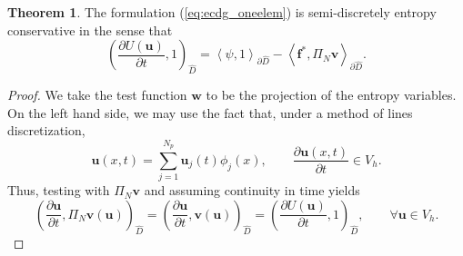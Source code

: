 \documentclass[preprint,10pt]{article}
\theoremstyle{definition}
\theoremstyle{lemma}
\theoremstyle{theorem}
\newtheorem{theorem}{Theorem}
\theoremstyle{assumption}
\newcommand{\pd}[2]{\frac{\partial#1}{\partial#2}}
\newcommand{\LRp}[1]{\left( #1 \right)}
\newcommand{\LRa}[1]{\left\langle #1 \right\rangle}
\begin{document}
\begin{theorem}
\label{lemma:ec1}
The formulation (\ref{eq:ecdg_oneelem})
 is semi-discretely entropy conservative in the sense that
\[
\LRp{\pd{U(\bm{u})}{t},1}_{\widehat{D}} =  \LRa{\psi,1}_{\partial \widehat{D}}-\LRa{{\bm{f}^*, \Pi_N\bm{v}}}_{\partial \widehat{D}}.
\]
\end{theorem}
\begin{proof}
We take the test function $\bm{w}$ to be the projection of the entropy variables.  On the left hand side, we may use the fact that, under a method of lines discretization, 
\[
\bm{u}(x,t) = \sum_{j=1}^{N_p} \bm{u}_j(t) \phi_j(x), \qquad \pd{\bm{u}(x,t)}{t} \in V_h.
\]
Thus, testing with $\Pi_N \bm{v}$ and assuming continuity in time yields 
\[
\LRp{\pd{\bm{u}}{t}, \Pi_N \bm{v}(\bm{u})}_{\widehat{D}} = \LRp{\pd{\bm{u}}{t},\bm{v}(\bm{u})}_{\widehat{D}} = \LRp{\pd{U(\bm{u})}{t},1}_{\widehat{D}}, \qquad \forall \bm{u}\in V_h.
\]


\end{proof}
\end{document}
